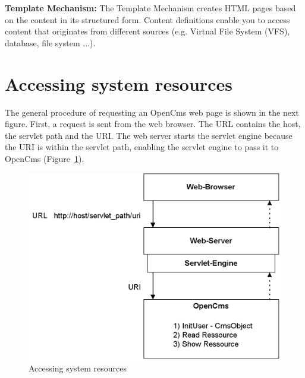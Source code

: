 {\bf Template Mechanism:}
The  Template Mechanism creates HTML pages based on the content in its
structured form. Content definitions enable you to access content that
originates from different sources (e.g. Virtual File System (VFS),
database, file system ...).


\section{Accessing system resources}
The general procedure of requesting an OpenCms web page is shown in the
next figure. First, a request is sent from the web browser. The URL
contains the host, the servlet path and the URI. The web server starts
the  servlet engine because the URI is within the servlet path, enabling
the servlet engine to pass it to OpenCms (Figure~\ref {Accessing1}).

\begin{figure}
\includegraphics[clip,width=\sgw]{pics/modules/3}
\caption[Accessing system resources]{Accessing system resources}
\label{Accessing1}
\end{figure}

